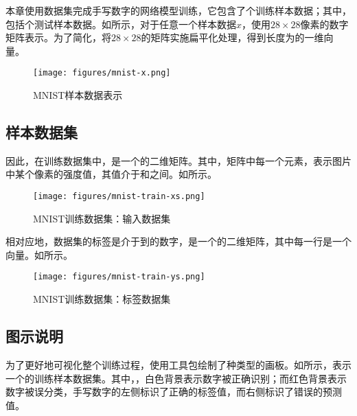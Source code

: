 \begin{content}

本章使用数据集完成手写数字的网络模型训练，它包含了个训练样本数据；其中，包括个测试样本数据。如所示，对于任意一个样本数据$x$，使用$28 \times 28$像素的数字矩阵表示。为了简化，将$28 \times 28$的矩阵实施扁平化处理，得到长度为的一维向量。

\begin{figure}[H]
\centering
\texttt{[image: figures/mnist-x.png]}
\caption{MNIST样本数据表示}
 \label{fig:mnist-x}
\end{figure}

\subsection{样本数据集}

因此，在训练数据集中，是一个\code{[60000, 784]}的二维矩阵。其中，矩阵中每一个元素，表示图片中某个像素的强度值，其值介于和之间。如所示。

\begin{figure}[H]
\centering
\texttt{[image: figures/mnist-train-xs.png]}
\caption{MNIST训练数据集：输入数据集}
 \label{fig:mnist-train-xs}
\end{figure}

相对应地，数据集的标签是介于到的数字，是一个\code{[60000, 10]}的二维矩阵，其中每一行是一个向量。如所示。

\begin{figure}[H]
\centering
\texttt{[image: figures/mnist-train-ys.png]}
\caption{MNIST训练数据集：标签数据集}
 \label{fig:mnist-train-ys}
\end{figure}

\subsection{图示说明}

\begin{content}

为了更好地可视化整个训练过程，使用工具包绘制了种类型的画板。如所示，表示一个的训练样本数据集。其中，，白色背景表示数字被正确识别；而红色背景表示数字被误分类，手写数字的左侧标识了正确的标签值，而右侧标识了错误的预测值。


\end{content}
\end{content}

